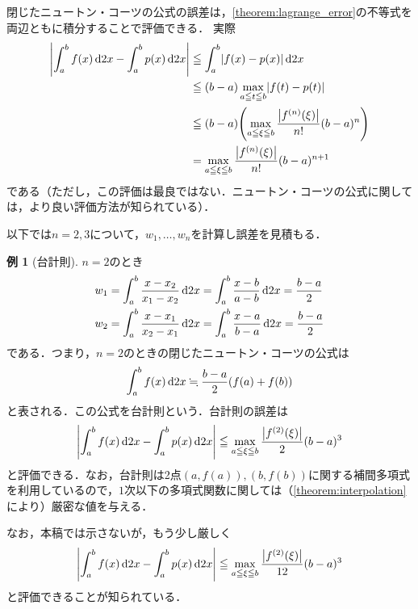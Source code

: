 \documentclass[a4paper]{ltjsarticle}
\theoremstyle{definition}
\newtheorem{example}{例}[section]
\DeclarePairedDelimiter{\abs}{\lvert}{\rvert}
\DeclarePairedDelimiter{\pqty}{\lparen}{\rparen}
\newcommand{\dd}[1]{\dl2#1}
\begin{document}
閉じたニュートン・コーツの公式の誤差は，\cref{theorem:lagrange_error}の不等式を両辺ともに積分することで評価できる．
実際
\begin{align*}
  \abs*{\int_a^b f(x) \dd{x} - \int_a^b p(x) \dd{x}}
  &\leqq \int_a^b \abs*{f(x) - p(x)} \dd{x} \\
  &\leqq (b-a)\max_{a\leqq t\leqq b} \abs*{f(t) - p(t)} \\
  &\leqq (b-a)\pqty*{\max_{a\leqq\xi\leqq b} \frac{\abs*{f^{(n)}(\xi)}}{n!} (b-a)^n} \\
  &= \max_{a\leqq\xi\leqq b} \frac{\abs*{f^{(n)}(\xi)}}{n!} (b-a)^{n+1}
\end{align*}
である（ただし，この評価は最良ではない．ニュートン・コーツの公式に関しては，より良い評価方法が知られている）．

以下では$n=2,3$について，$w_1,\dots,w_n$を計算し誤差を見積もる．

\begin{example}[台計則]
  $n=2$のとき
  \begin{align*}
    w_1
    &= \int_a^b \frac{x-x_2}{x_1-x_2} \dd{x}
     = \int_a^b \frac{x-b}{a-b} \dd{x}
     = \frac{b-a}{2} \\
    w_2
    &= \int_a^b \frac{x-x_1}{x_2-x_1} \dd{x}
     = \int_a^b \frac{x-a}{b-a} \dd{x}
     = \frac{b-a}{2}
  \end{align*}
  である．つまり，$n=2$のときの閉じたニュートン・コーツの公式は
  \[
    \int_a^b f(x) \dd{x} \fallingdotseq \frac{b-a}{2} \pqty*{f(a)+f(b)}
  \]
  と表される．この公式を台計則という．台計則の誤差は
  \[
    \abs*{\int_a^b f(x) \dd{x} - \int_a^b p(x) \dd{x}}
    \leqq \max_{a\leqq\xi\leqq b} \frac{\abs*{f^{(2)}(\xi)}}{2} (b-a)^3
  \]
  と評価できる．なお，台計則は2点$(a,f(a)),(b,f(b))$に関する補間多項式を利用しているので，$1$次以下の多項式関数に関しては（\cref{theorem:interpolation}により）厳密な値を与える．

  なお，本稿では示さないが，もう少し厳しく
  \[
    \abs*{\int_a^b f(x) \dd{x} - \int_a^b p(x) \dd{x}} \leqq \max_{a\leqq\xi\leqq b} \frac{\abs*{f^{(2)}(\xi)}}{12} (b-a)^3
  \]
  と評価できることが知られている\cite{kikuchi}．
\end{example}
\end{document}
